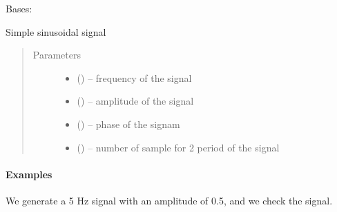\documentclass[letterpaper,10pt,english]{sphinxmanual}
\begin{document}
\begin{fulllineitems}
\label{\detokenize{triflow.plugins:triflow.plugins.signals.SinusoidalSignal}}
Bases: {\hyperref[\detokenize{triflow.plugins:triflow.plugins.signals.Signal}]{}}

Simple sinusoidal signal
\begin{quote}\begin{description}
\item[{Parameters}] \leavevmode\begin{itemize}
\item {} 
 () -- frequency of the signal

\item {} 
 () -- amplitude of the signal

\item {} 
 (\sphinxstyleliteralemphasis{, }) -- phase of the signam

\item {} 
 (\sphinxstyleliteralemphasis{, }) -- number of sample for 2 period of the signal

\end{itemize}

\end{description}\end{quote}
\paragraph{Examples}

We generate a 5 Hz signal with an amplitude of 0.5, and we check the signal.


\end{fulllineitems}
\end{document}

